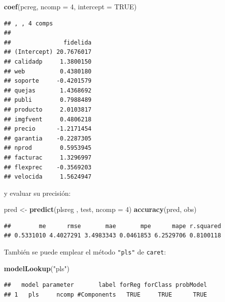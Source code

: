 \documentclass[
]{book}
\newenvironment{Shaded}{\begin{snugshade}}{\end{snugshade}}
\newcommand{\DataTypeTok}[1]{\textcolor[rgb]{0.13,0.29,0.53}{#1}}
\newcommand{\DecValTok}[1]{\textcolor[rgb]{0.00,0.00,0.81}{#1}}
\newcommand{\KeywordTok}[1]{\textcolor[rgb]{0.13,0.29,0.53}{\textbf{#1}}}
\newcommand{\NormalTok}[1]{#1}
\newcommand{\OtherTok}[1]{\textcolor[rgb]{0.56,0.35,0.01}{#1}}
\newcommand{\StringTok}[1]{\textcolor[rgb]{0.31,0.60,0.02}{#1}}
\theoremstyle{break}
\theoremstyle{definition}
\theoremstyle{definition}
\theoremstyle{definition}
\theoremstyle{remark}
\begin{document}
\begin{Shaded}
\begin{Highlighting}[]
\KeywordTok{coef}\NormalTok{(pcreg, }\DataTypeTok{ncomp =} \DecValTok{4}\NormalTok{, }\DataTypeTok{intercept =} \OtherTok{TRUE}\NormalTok{)}
\end{Highlighting}
\end{Shaded}

\begin{verbatim}
## , , 4 comps
## 
##               fidelida
## (Intercept) 20.7676017
## calidadp     1.3800150
## web          0.4380180
## soporte     -0.4201579
## quejas       1.4368692
## publi        0.7988489
## producto     2.0103817
## imgfvent     0.4806218
## precio      -1.2171454
## garantia    -0.2287305
## nprod        0.5953945
## facturac     1.3296997
## flexprec    -0.3569203
## velocida     1.5624947
\end{verbatim}

y evaluar su precisión:

\begin{Shaded}
\begin{Highlighting}[]
\NormalTok{pred <-}\StringTok{ }\KeywordTok{predict}\NormalTok{(plsreg , test, }\DataTypeTok{ncomp =} \DecValTok{4}\NormalTok{)}
\KeywordTok{accuracy}\NormalTok{(pred, obs)}
\end{Highlighting}
\end{Shaded}

\begin{verbatim}
##        me      rmse       mae       mpe      mape r.squared 
## 0.5331010 4.4027291 3.4983343 0.0461853 6.2529706 0.8100118
\end{verbatim}

También se puede emplear el método \texttt{"pls"} de \texttt{caret}:

\begin{Shaded}
\begin{Highlighting}[]
\KeywordTok{modelLookup}\NormalTok{(}\StringTok{"pls"}\NormalTok{)}
\end{Highlighting}
\end{Shaded}

\begin{verbatim}
##   model parameter       label forReg forClass probModel
## 1   pls     ncomp #Components   TRUE     TRUE      TRUE
\end{verbatim}
\end{document}
